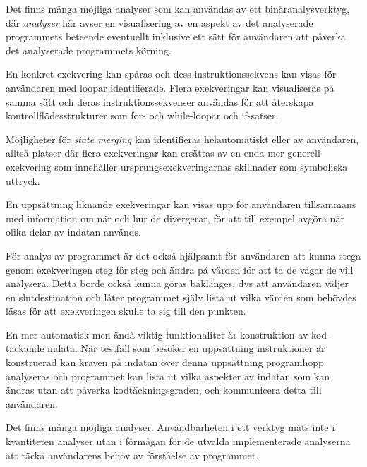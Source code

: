 Det finns många möjliga analyser som kan användas av ett binäranalysverktyg, där
\textit{analyser} här avser en visualisering av en aspekt av det analyserade
programmets beteende eventuellt inklusive ett sätt för användaren att påverka
det analyserade programmets körning.

En konkret exekvering kan spåras och dess instruktionssekvens kan visas för
användaren med loopar identifierade. Flera exekveringar kan visualiseras på
samma sätt och deras instruktionssekvenser användas för att återskapa
kontrollflödesstrukturer som for- och while-loopar och if-satser.

Möjligheter för \textit{state merging} kan identifieras helautomatiskt eller av
användaren, alltså platser där flera exekveringar kan ersättas av en enda mer
generell exekvering som innehåller ursprungsexekveringarnas skillnader som
symboliska uttryck.

En uppsättning liknande exekveringar kan visas upp för användaren tillsammans
med information om när och hur de divergerar, för att till exempel avgöra när
olika delar av indatan används.

För analys av programmet är det också hjälpsamt för användaren att kunna stega
genom exekveringen steg för steg och ändra på värden för att ta de vägar de vill
analysera. Detta borde också kunna göras baklänges, dvs att användaren väljer en
slutdestination och låter programmet själv lista ut vilka värden som behövdes
läsas för att exekveringen skulle ta sig till den punkten.

En mer automatisk men ändå viktig funktionalitet är konstruktion av
kod-täckande indata. När testfall som besöker en uppsättning instruktioner är
konstruerad kan kraven på indatan över denna uppsättning programhopp analyseras
och programmet kan lista ut vilka aspekter av indatan som kan ändras utan att
påverka kodtäckningsgraden, och kommunicera detta till användaren.

Det finns många möjliga analyser. Användbarheten i ett verktyg mäts inte i
kvantiteten analyser utan i förmågan för de utvalda implementerade analyserna
att täcka användarens behov av förståelse av programmet.
